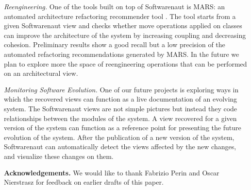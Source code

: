 \documentclass[preprint,12pt]{elsarticle}
\begin{document}
\begin{description}

\item {\em Reengineering.}
One of the tools built on top of Softwarenaut is MARS: an automated architecture refactoring recommender tool \cite{boeckmann-mars}. The tool starts from a given Softwarenaut view and checks whether move operations applied on classes can improve the architecture of the system by increasing coupling and decreasing cohesion. Preliminary results show a good recall but a low precision of the  automated refactoring recommendations generated by MARS. In the future we plan to explore more the space of reengineering operations that can be performed on an architectural view.


\item {\em Monitoring Software Evolution.}
One of our future projects is exploring ways in which the recovered views can function as a live documentation of an evolving system. The Softwarenaut views are not simple pictures but instead they code relationships between the modules of the system. A view recovered for a given version of the system can function as a reference point for presenting the future evolution of the system. After the publication of a new version of the system, Softwarenaut can automatically detect the views affected by the new changes, and visualize these changes on them.

\end{description}


\vspace{0.5cm}
\footnotesize
{\bf Acknowledgements.} We would like to thank Fabrizio Perin and Oscar Nierstrasz for feedback on earlier drafts of this paper.



\newpage

\footnotesize













\end{document}
